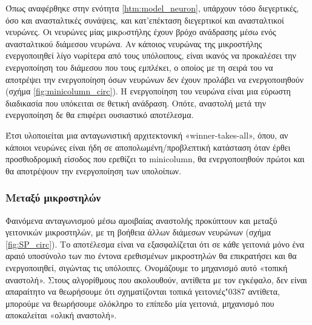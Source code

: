 {	Όπως αναφέρθηκε στην ενότητα \ref{htm:model_neuron}, υπάρχουν τόσο διεγερτικές, όσο και ανασταλτικές συνάψεις, και κατ'επέκταση διεγερτικοί και ανασταλτικοί νευρώνες.
	Οι νευρώνες μίας μικρoστήλης έχουν βρόχο ανάδρασης μέσω ενός ανασταλτικού διάμεσου νευρώνα.
	Αν κάποιος νευρώνας της μικροστήλης ενεργοποιηθεί λίγο νωρίτερα από τους υπόλοιπους, είναι ικανός να προκαλέσει την ενεργοποίηση του διάμεσου που τους εμπλέκει,
	ο οποίος με τη σειρά του να αποτρέψει την ενεργοποίηση όσων νευρώνων δεν έχουν προλάβει να ενεργοποιηθούν (σχήμα \ref{fig:minicolumn_circ}).
	Η ενεργοποίηση του νευρώνα είναι μια εύρωστη διαδικασία που υπόκειται σε θετική ανάδραση.
	Οπότε, αναστολή μετά την ενεργοποίηση δε θα επιφέρει ουσιαστικό αποτέλεσμα.

	Έτσι υλοποιείται μια ανταγωνιστική αρχιτεκτονική «winner-takes-all», όπου,
	αν κάποιοι νευρώνες είναι ήδη σε αποπολωμένη/προβλεπτική κατάσταση όταν έρθει προσθιοδρομική είσοδος που ερεθίζει το minicolumn,
	θα ενεργοποιηθούν πρώτοι και θα αποτρέψουν την ενεργοποίηση των υπολοίπων.
	}

	\subsubsection{Μεταξύ μικροστηλών} \label{htm:sp_inhibition}

	Φαινόμενα ανταγωνισμού μέσω αμοιβαίας αναστολής προκύπτουν και μεταξύ γειτονικών μικροστηλών, με τη βοήθεια άλλων διάμεσων νευρώνων (σχήμα \ref{fig:SP_circ}).
	Το αποτέλεσμα είναι να εξασφαλίζεται ότι σε κάθε γειτονιά μόνο ένα αραιό υποσύνολο των πιο έντονα ερεθισμένων μικροστηλών θα επικρατήσει
	και θα ενεργοποιηθεί, σιγώντας τις υπόλοιπες.
	Ονομάζουμε το μηχανισμό αυτό «τοπική αναστολή».
	Στους αλγορίθμους που ακολουθούν, αντίθετα με τον εγκέφαλο, δεν είναι απαραίτητο να θεωρήσουμε ότι σχηματίζονται τοπικά γειτονιές\char"0387
	αντίθετα, μπορούμε να θεωρήσουμε ολόκληρο το επίπεδο μία γειτονιά, μηχανισμό που αποκαλείται «ολική αναστολή».

